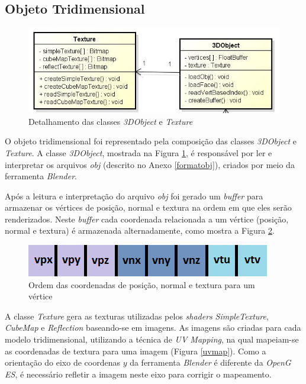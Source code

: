 \subsection{Objeto Tridimensional}   

	\begin{figure}[ht]
	\centering
		\includegraphics[keepaspectratio=true,scale=0.6]{figuras/object_texture.jpg}
	\caption{Detalhamento das classes \textit{3DObject} e \textit{Texture}}
	\label{object_texture}
	\end{figure}

	O objeto tridimensional foi representado pela composição das classes \textit{3DObject} e \textit{Texture}. A classe \textit{3DObject}, mostrada na Figura \ref{object_texture}, é responsável por ler e interpretar os arquivos  \textit{obj}  (descrito no Anexo \ref{formatobj}), criados por meio da ferramenta \textit{Blender}.

	Após a leitura e interpretação do arquivo \textit{obj} foi gerado um \textit{buffer} para armazenar os vértices de posição, normal e textura na ordem em que eles serão renderizados. Neste \textit{buffer} cada coordenada relacionada a um vértice (posição, normal e textura) é armazenada alternadamente, como mostra a Figura \ref{buffer}.

	\begin{figure}[ht]
	\centering
		\includegraphics[keepaspectratio=true,scale=1.0]{figuras/buffer.png}
	\caption{Ordem das coordenadas de posição, normal e textura para um vértice}
	\label{buffer}
	\end{figure}

	A classe \textit{Texture} gera as texturas utilizadas pelos \textit{shaders} \textit{SimpleTexture}, \textit{CubeMap} e \textit{Reflection} baseando-se em imagens. As imagens são criadas para cada modelo tridimensional, utilizando a técnica de \textit{UV Mapping}, na qual mapeiam-se as coordenadas de textura para uma imagem (Figura \ref{uvmap}). Como a orientação do eixo de coordenas $y$ da ferramenta \textit{Blender} é diferente da \textit{OpenG ES}, é necessário refletir a imagem neste eixo para corrigir o mapeamento.

